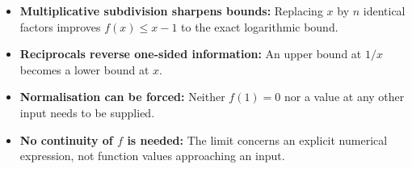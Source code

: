 \begin{takeaways}
\begin{itemize}
\item \textbf{Multiplicative subdivision sharpens bounds:} Replacing \(x\) by \(n\) identical factors improves \(f(x)\le x-1\) to the exact logarithmic bound.
\item \textbf{Reciprocals reverse one-sided information:} An upper bound at \(1/x\) becomes a lower bound at \(x\).
\item \textbf{Normalisation can be forced:} Neither \(f(1)=0\) nor a value at any other input needs to be supplied.
\item \textbf{No continuity of \(f\) is needed:} The limit concerns an explicit numerical expression, not function values approaching an input.
\end{itemize}
\end{takeaways}
